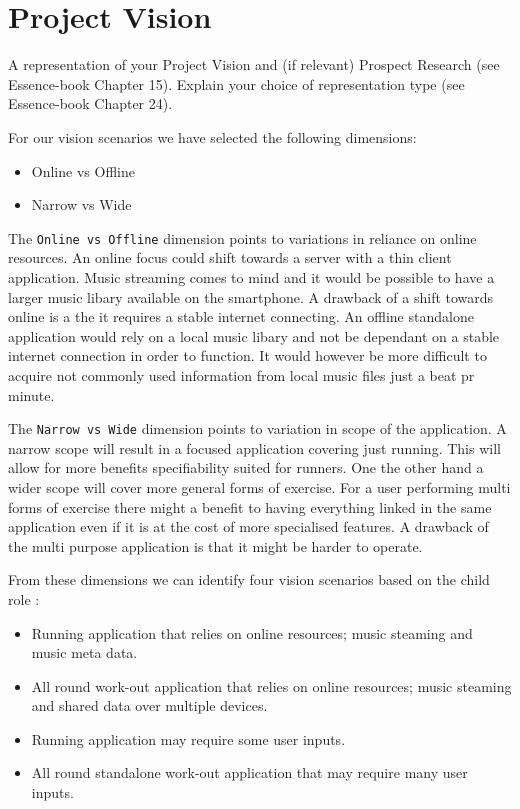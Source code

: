 \section{Project Vision}
A representation of your Project Vision and (if relevant) Prospect Research (see Essence-book Chapter 15).
Explain your choice of representation type (see Essence-book Chapter 24).

For our vision scenarios \cite[ p. 127]{essence} we have selected the following dimensions:
\begin{itemize}
\item Online vs Offline %
\item Narrow vs Wide
\end{itemize}

The \texttt{Online vs Offline} dimension points to variations in reliance on online resources. An online focus could shift  towards a server with a thin client application. Music streaming comes to mind and it would be possible to have a larger music libary available on the smartphone. A drawback of a shift towards online is a the it requires a stable internet connecting. An offline standalone application would rely on a local music libary and not be dependant on a stable internet connection in order to function. It would however be more difficult to acquire not commonly used information from local music files just a beat pr minute.


The \texttt{Narrow vs Wide} dimension points to variation in scope of the application. A narrow scope will result in a focused application covering just running. This will allow for more benefits specifiability suited for runners. One the other hand a wider scope will cover more general forms of exercise. For a user performing multi forms of exercise there might a benefit to having everything linked in the same application even if it is at the cost of more specialised features. A drawback of the multi purpose application is that it might be harder to operate.



From these dimensions we can identify four vision scenarios based on the child role  \cite[ pp. 132-134]{essence}:

\begin{itemize}
\item Running application that relies on online resources; music steaming and music meta data. %
\item All round work-out application that relies on online resources; music steaming and shared data over multiple devices. %
\item Running application may require some user inputs. %
\item All round standalone work-out application that may require many user inputs. %
\end{itemize}

